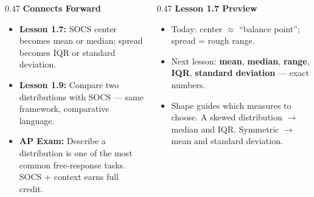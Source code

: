 \documentclass[aspectratio=169, 11pt]{beamer}
\begin{document}
{
\begin{frame}[t, plain]
  \vspace{1.2cm}\par
  \vspace{0.3em}%
  \hspace{0.55cm}%
  \begin{minipage}{0.9\textwidth}

    \begin{columns}[t]
    \begin{column}{0.47\textwidth}
      {\color{goldacc}\bfseries\small Connects Forward}
      \begin{itemize}
        \setlength{\itemsep}{0.45em}\color{white}\small
        \item \textbf{Lesson 1.7:} SOCS center becomes mean or median;
              spread becomes IQR or standard deviation.
        \item \textbf{Lesson 1.9:} Compare two distributions with SOCS ---
              same framework, comparative language.
        \item \textbf{AP Exam:} Describe a distribution is one of the most
              common free-response tasks. SOCS + context earns full credit.
      \end{itemize}
    \end{column}
    \begin{column}{0.47\textwidth}
      {\color{skymid}\bfseries\small Lesson 1.7 Preview}
      \begin{itemize}
        \setlength{\itemsep}{0.45em}\color{white!85!navy}\small
        \item Today: center $\approx$ ``balance point''; spread = rough range.
        \item Next lesson: \textbf{mean}, \textbf{median}, \textbf{range},
              \textbf{IQR}, \textbf{standard deviation} --- exact numbers.
        \item Shape guides which measures to choose. A skewed distribution
              $\to$ median and IQR. Symmetric $\to$ mean and standard deviation.
      \end{itemize}
    \end{column}
    \end{columns}

  \end{minipage}
\end{frame}
}
\end{document}
